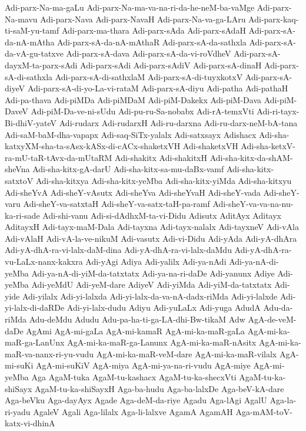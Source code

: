 {Adi-parx-Na-ma-gaLu
Adi-parx-Na-ma-va-na-ri-da-he-neM-ba-vaMge
Adi-parx-Na-mavu
Adi-parx-Nava
Adi-parx-NavaH
Adi-parx-Na-va-ga-LAru
Adi-parx-kaq-ti-saM-yu-tamf
Adi-parx-ma-thara
Adi-parx-sAda
Adi-parx-sAdaH
Adi-parx-sA-da-nA-mAtha
Adi-parx-sA-da-nA-mAthaR
Adi-parx-sA-da-sathxla
Adi-parx-sA-da-vA-gu-tatxve
Adi-parx-sA-dava
Adi-parx-sA-da-vi-roVdheV
Adi-parx-sA-dayxM-ta-parx-sAdi
Adi-parx-sAdi
Adi-parx-sAdiV
Adi-parx-sA-dinaH
Adi-parx-sA-di-sathxla
Adi-parx-sA-di-sathxlaM
Adi-parx-sA-di-tuyxkotxV
Adi-parx-sA-diyeV
Adi-parx-sA-di-yo-La-vi-rataM
Adi-parx-sA-diyu
Adi-patha
Adi-pathaH
Adi-pa-thava
Adi-piMDa
Adi-piMDaM
Adi-piM-Dakekx
Adi-piM-Dava
Adi-piM-DaveV
Adi-piM-Da-ve-ni-sUdu
Adi-pu-ru-Sa-nobabx
Adi-rA-temxVti
Adi-ri-tayx-Bi-dhiV-yateV
Adi-rudarx
Adi-rudarxH
Adi-ru-darxna
Adi-ru-darx-neM-bA-tana
Adi-saM-baM-dha-vapapx
Adi-saq-SiTx-yalalx
Adi-satxsayx
Adishacx
Adi-sha-katxyXM-sha-ta-sAsx-kASx-di-cACx-shaketxVH
Adi-shaketxVH
Adi-sha-ketxV-ra-mU-taR-tAvx-da-mUtaRM
Adi-shakitx
Adi-shakitxH
Adi-sha-kitx-da-shAM-sheVna
Adi-sha-kitx-gA-darU
Adi-sha-kitx-sa-mu-daBx-vamf
Adi-sha-kitx-satxtoV
Adi-sha-kitxya
Adi-sha-kitx-yeMba
Adi-sha-kitx-yiMda
Adi-sha-kitxyu
Adi-sheYvA
Adi-sheY-vAsutx
Adi-sheYva
Adi-sheYvaH
Adi-sheY-vada
Adi-sheY-varu
Adi-sheY-va-satxtaH
Adi-sheY-va-satx-taH-pa-ramf
Adi-sheY-va-va-na-nu-ka-ri-sade
Adi-shi-vanu
Adi-si-dAdhxM-ta-vi-Didu
Adisutx
AditAyx
Aditayx
AditayxH
Adi-tayx-maM-Dala
Adi-tayxna
Adi-tayx-nalalx
Adi-tayxneV
Adi-vAla
Adi-vAlaH
Adi-vA-la-ve-nikuM
Adi-vasutx
Adi-vi-Didu
Adi-yAda
Adi-yA-dhAra
Adi-yA-dhA-ra-vi-lalx-daM-dina
Adi-yA-dhA-ra-vi-lalx-daMdu
Adi-yA-dhA-ra-vu-LaLx-nanx-kakxra
Adi-yAgi
Adiya
Adi-yalilx
Adi-ya-nAdi
Adi-ya-nA-di-yeMba
Adi-ya-nA-di-yiM-da-tatxtatx
Adi-ya-na-ri-daDe
Adi-yanunx
Adiye
Adi-yeMba
Adi-yeMdU
Adi-yeM-dare
AdiyeV
Adi-yiMda
Adi-yiM-da-tatxtatx
Adi-yide
Adi-yilalx
Adi-yi-lalxda
Adi-yi-lalx-da-va-nA-dadx-riMda
Adi-yi-lalxde
Adi-yi-lalx-di-daRDe
Adi-yi-lalx-dudu
Adiyu
Adi-yuLaLx
Adi-yuga
AdudA
Adu-da-riMda
Adu-deMdu
Adudu
Adu-pa-ha-ti-ga-LA-dhi-Bw-tikaM
Adw
AgA-de-veM-daDe
AgAmi
AgA-mi-gaLa
AgA-mi-kamaR
AgA-mi-ka-maR-gaLa
AgA-mi-ka-maR-ga-LanUnx
AgA-mi-ka-maR-ga-Lanunx
AgA-mi-ka-maR-nAsitx
AgA-mi-ka-maR-va-nanx-ri-yu-vudu
AgA-mi-ka-maR-veM-dare
AgA-mi-ka-maR-vilalx
AgA-mi-suKi
AgA-mi-suKiV
AgA-miya
AgA-mi-ya-na-ri-vudu
AgA-miye
AgA-mi-yeMba
Aga
AgaM-tuka
AgaM-tu-kashacx
AgaM-tu-ka-shecxVti
AgaM-tu-ka-shiSayx
AgaM-tu-ka-shiSayxH
Aga-ba-hudu
Aga-ba-lalxDe
Aga-beV-kA-dare
Aga-beVku
Aga-dayAyx
Agade
Aga-deM-da-riye
Agadu
Aga-lAgi
AgalU
Aga-la-ri-yadu
AgaleV
Agali
Aga-lilalx
Aga-li-lalxve
AgamA
AgamAH
Aga-mAM-toV-katx-vi-dhinA
}
